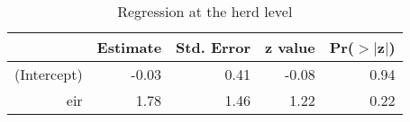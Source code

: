 \begin{table}[ht]
\centering
\caption{Regression at the herd level} 
\begin{tabular}{rrrrr}
  \hline
 & Estimate & Std. Error & z value & Pr($>$$|$z$|$) \\ 
  \hline
(Intercept) & -0.03 & 0.41 & -0.08 & 0.94 \\ 
  eir & 1.78 & 1.46 & 1.22 & 0.22 \\ 
   \hline
\end{tabular}
\end{table}
